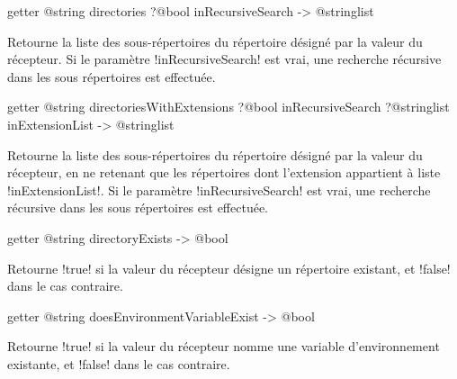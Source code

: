 
\begin{galgas4box}
getter @string directories ?@bool inRecursiveSearch -> @stringlist
\end{galgas4box}

Retourne la liste des sous-répertoires du répertoire désigné par la valeur du récepteur. Si le paramètre \ggsq!inRecursiveSearch! est vrai, une recherche récursive dans les sous répertoires est effectuée.










\begin{galgas4box}
getter @string directoriesWithExtensions
    ?@bool inRecursiveSearch
    ?@stringlist inExtensionList -> @stringlist
\end{galgas4box}

Retourne la liste des sous-répertoires du répertoire désigné par la valeur du récepteur, en ne retenant que les répertoires dont l'extension appartient à liste \ggsq!inExtensionList!. Si le paramètre \ggsq!inRecursiveSearch! est vrai, une recherche récursive dans les sous répertoires est effectuée.









\begin{galgas4box}
getter @string directoryExists -> @bool
\end{galgas4box}

Retourne \ggsq!true! si la valeur du récepteur désigne un répertoire existant, et \ggsq!false! dans le cas contraire.









\begin{galgas4box}
getter @string doesEnvironmentVariableExist -> @bool
\end{galgas4box}

Retourne \ggsq!true! si la valeur du récepteur nomme une variable d'environnement existante, et \ggsq!false! dans le cas contraire.








